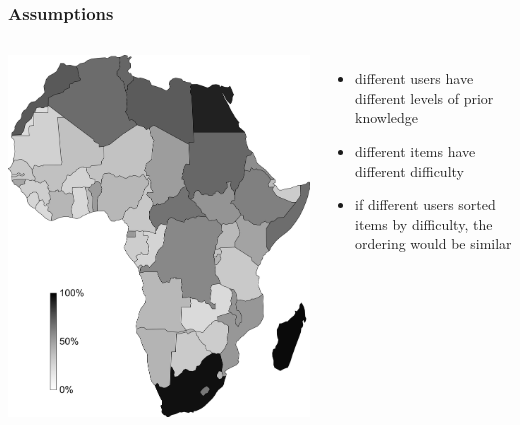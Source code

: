 \documentclass[xcolor=svgnames]{beamer}
\begin{document}
\begin{frame}
	\frametitle{Assumptions}
	\begin{columns}
			\includegraphics[width=\textwidth]{2014-IA068-adaptive-practice/africa-with-scale.png}
			\begin{itemize}
				\item different users have different levels of prior knowledge
				\item different items have different difficulty
				\item if different users sorted items by difficulty,
							the ordering would be similar
			\end{itemize}
	\end{columns}
\end{frame}
\end{document}
